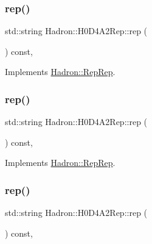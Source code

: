 \subsubsection{\texorpdfstring{rep()}{rep()}\hspace{0.1cm}{\footnotesize\ttfamily [2/5]}}
{\footnotesize\ttfamily std\+::string Hadron\+::\+H0\+D4\+A2\+Rep\+::rep (\begin{DoxyParamCaption}{ }\end{DoxyParamCaption}) const\hspace{0.3cm}{\ttfamily [inline]}, {\ttfamily [virtual]}}



Implements \mbox{\hyperlink{structHadron_1_1RepRep_ab3213025f6de249f7095892109575fde}{Hadron\+::\+Rep\+Rep}}.

\mbox{\label{structHadron_1_1H0D4A2Rep_ad23c66fe369200d0ff8bebcabf8dfc62}} 
\subsubsection{\texorpdfstring{rep()}{rep()}\hspace{0.1cm}{\footnotesize\ttfamily [3/5]}}
{\footnotesize\ttfamily std\+::string Hadron\+::\+H0\+D4\+A2\+Rep\+::rep (\begin{DoxyParamCaption}{ }\end{DoxyParamCaption}) const\hspace{0.3cm}{\ttfamily [inline]}, {\ttfamily [virtual]}}



Implements \mbox{\hyperlink{structHadron_1_1RepRep_ab3213025f6de249f7095892109575fde}{Hadron\+::\+Rep\+Rep}}.

\mbox{\label{structHadron_1_1H0D4A2Rep_ad23c66fe369200d0ff8bebcabf8dfc62}} 
\subsubsection{\texorpdfstring{rep()}{rep()}\hspace{0.1cm}{\footnotesize\ttfamily [4/5]}}
{\footnotesize\ttfamily std\+::string Hadron\+::\+H0\+D4\+A2\+Rep\+::rep (\begin{DoxyParamCaption}{ }\end{DoxyParamCaption}) const\hspace{0.3cm}{\ttfamily [inline]}, {\ttfamily [virtual]}}



